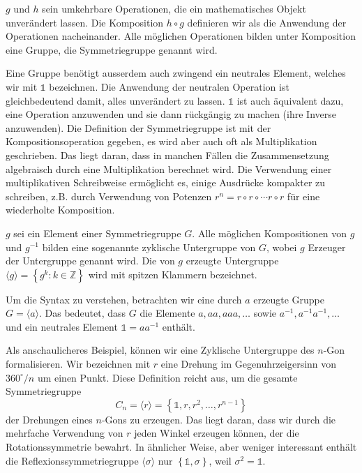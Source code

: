 \begin{definition}[Symmetriegruppe]
  \(g\) und \(h\) sein umkehrbare Operationen, die ein mathematisches Objekt unverändert lassen.
  Die Komposition \(h\circ g\) definieren wir als die Anwendung der Operationen nacheinander.
  Alle möglichen Operationen bilden unter Komposition eine Gruppe, die Symmetriegruppe genannt wird.
\end{definition}

Eine Gruppe benötigt ausserdem auch zwingend ein neutrales Element, welches wir mit \(\mathds{1}\) bezeichnen.
Die Anwendung der neutralen Operation ist gleichbedeutend damit, alles unverändert zu lassen.
\(\mathds{1}\) ist auch äquivalent dazu, eine Operation anzuwenden und sie dann rückgängig zu machen (ihre Inverse anzuwenden).
 Die Definition der Symmetriegruppe ist mit der Kompositionsoperation gegeben, es wird aber auch oft als Multiplikation geschrieben.
Das liegt daran, dass in manchen Fällen die Zusammensetzung algebraisch durch eine Multiplikation berechnet wird.
Die Verwendung einer multiplikativen Schreibweise ermöglicht es, einige Ausdrücke kompakter zu schreiben, z.B.
durch Verwendung von Potenzen \(r^n = r\circ r \circ \cdots r\circ r\) für eine wiederholte Komposition.

\begin{definition}
  \(g\) sei ein Element einer Symmetriegruppe \(G\).
  Alle möglichen Kompositionen von \(g\) und \(g^{-1}\) bilden eine sogenannte zyklische Untergruppe von \(G\), wobei \(g\) Erzeuger der Untergruppe genannt wird.
  Die von \(g\) erzeugte Untergruppe \(\langle g \rangle = \left\{ g^k : k \in \mathbb{Z} \right\}\) wird mit spitzen Klammern bezeichnet.
\end{definition}
\begin{beispiel}
  Um die Syntax zu verstehen, betrachten wir eine durch \(a\) erzeugte Gruppe \(G = \langle a \rangle\).
  Das bedeutet, dass \(G\) die Elemente \(a, aa, aaa, \ldots\) sowie \(a^{-1}, a^{-1}a^{-1}, \ldots\) und ein neutrales Element \(\mathds{1} = aa^{-1}\) enthält.
\end{beispiel}
\begin{beispiel}
  Als anschaulicheres Beispiel, können wir eine Zyklische Untergruppe des \(n\)-Gon formalisieren.
  Wir bezeichnen mit \(r\) eine Drehung im Gegenuhrzeigersinn von \(360^\circ/n\) um einen Punkt.
  Diese Definition reicht aus, um die gesamte Symmetriegruppe
  \[
    C_n = \langle r \rangle
      = \left\{\mathds{1}, r, r^2, \ldots, r^{n-1}\right\}
  \]
  der Drehungen eines \(n\)-Gons zu erzeugen.
  Das liegt daran, dass wir durch die mehrfache Verwendung von \(r\) jeden Winkel erzeugen k\"onnen, der die Rotationssymmetrie bewahrt.
  In ähnlicher Weise, aber weniger interessant  enthält die Reflexionssymmetriegruppe \(\langle\sigma\rangle\) nur \(\left\{\mathds{1}, \sigma\right\}\), weil \(\sigma^2 = \mathds{1}\).
\end{beispiel}


